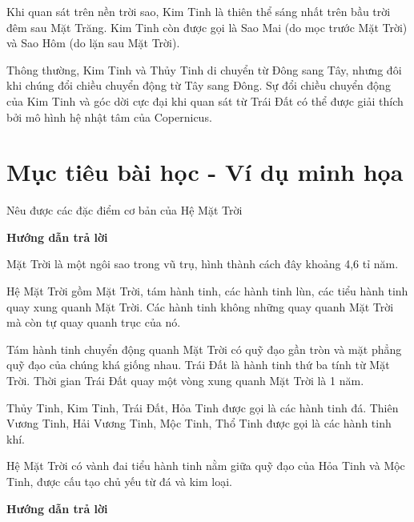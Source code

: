 Khi quan sát trên nền trời sao, Kim Tinh là thiên thể sáng nhất trên bầu trời đêm sau Mặt Trăng. Kim Tinh còn được gọi là Sao Mai (do mọc trước Mặt Trời) và Sao Hôm (do lặn sau Mặt Trời).

Thông thường, Kim Tinh và Thủy Tinh di chuyển từ Đông sang Tây, nhưng đôi khi chúng đổi chiều chuyển động từ Tây sang Đông. Sự đổi chiều chuyển động của Kim Tinh và góc dời cực đại khi quan sát từ Trái Đất có thể được giải thích bởi mô hình hệ nhật tâm của Copernicus.

\section{Mục tiêu bài học - Ví dụ minh họa}
\begin{dang}{Nêu được các đặc điểm cơ bản của Hệ Mặt Trời}
	{	\begin{center}
			\textbf{Hướng dẫn trả lời}
		\end{center}
		
		Mặt Trời là một ngôi sao trong vũ trụ, hình thành cách đây khoảng 4,6 tỉ năm.
		
		Hệ Mặt Trời gồm Mặt Trời, tám hành tinh, các hành tinh lùn, các tiểu hành tinh quay xung quanh Mặt Trời. Các hành tinh không những quay quanh Mặt Trời mà còn tự quay quanh trục của nó.
		
		Tám hành tinh chuyển động quanh Mặt Trời có quỹ đạo gần tròn và mặt phẳng quỹ đạo của chúng khá giống nhau. Trái Đất là hành tinh thứ ba tính từ Mặt Trời. Thời gian Trái Đất quay một vòng xung quanh Mặt Trời là 1 năm.
		
		Thủy Tinh, Kim Tinh, Trái Đất, Hỏa Tinh được gọi là các hành tinh đá. Thiên Vương Tinh, Hải Vương Tinh, Mộc Tinh, Thổ Tinh được gọi là các hành tinh khí.
		
		Hệ Mặt Trời có vành đai tiểu hành tinh nằm giữa quỹ đạo của Hỏa Tinh và Mộc Tinh, được cấu tạo chủ yếu từ đá và kim loại.
	}
	{	\begin{center}
			\textbf{Hướng dẫn trả lời}
		\end{center}
		
}
\end{dang}
